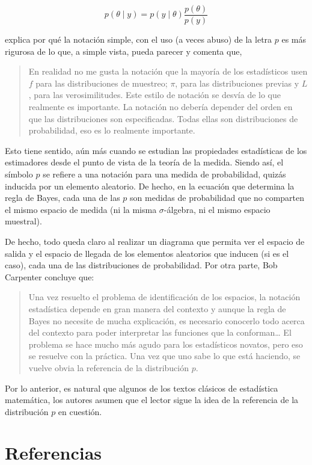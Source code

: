 \documentclass[
  spanish,
]{book}
\theoremstyle{definition}
\theoremstyle{definition}
\theoremstyle{definition}
\theoremstyle{remark}
\begin{document}
\[p(\theta \mid y)=p(y \mid \theta)\frac{p(\theta)}{p(y)}\]

\citet{Gelman95} explica por qué la notación simple, con el uso (a
veces abuso) de la letra \(p\) es más rigurosa de lo que, a simple vista,
pueda parecer y comenta que,

\begin{quote}
En realidad no me gusta la notación que la mayoría de los estadísticos usen \(f\) para las distribuciones de muestreo; \(\pi\), para las distribuciones previas y \(L\), para las verosimilitudes. Este estilo de notación se desvía de lo que realmente es importante. La notación no debería depender del orden en que las distribuciones son especificadas. Todas ellas son distribuciones de probabilidad, eso es lo realmente importante.
\end{quote}

Esto tiene sentido, aún más cuando se estudian las propiedades
estadísticas de los estimadores desde el punto de vista de la teoría de
la medida. Siendo así, el símbolo \(p\) se refiere a una notación para una
medida de probabilidad, quizás inducida por un elemento aleatorio. De
hecho, en la ecuación que determina la regla de Bayes, cada una de las
\(p\) son medidas de probabilidad que no comparten el mismo espacio de
medida (ni la misma \(\sigma\)-álgebra, ni el mismo espacio muestral).

De hecho, todo queda claro al realizar un diagrama que permita ver el
espacio de salida y el espacio de llegada de los elementos aleatorios
que inducen (si es el caso), cada una de las distribuciones de
probabilidad. Por otra parte, Bob Carpenter concluye que:

\begin{quote}
Una vez resuelto el problema de identificación de los espacios, la notación estadística depende en gran manera del contexto y aunque la regla de Bayes no necesite de mucha explicación, es necesario conocerlo todo acerca del contexto para poder interpretar las funciones que la conforman\ldots{} El problema se hace mucho más agudo para los estadísticos novatos, pero eso se resuelve con la práctica. Una vez que uno sabe lo que está haciendo, se vuelve obvia la referencia de la distribución \(p\).
\end{quote}

Por lo anterior, es natural que algunos de los textos clásicos de
estadística matemática, los autores asumen que el lector sigue la idea
de la referencia de la distribución \(p\) en cuestión.

\hypertarget{referencias}{%
\chapter*{Referencias}\label{referencias}}

  
\end{document}
